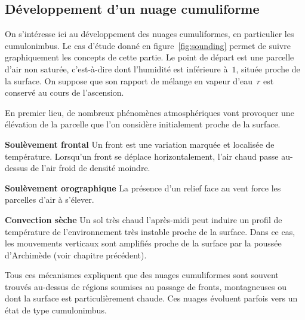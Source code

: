 
\sk
\subsection{Développement d'un nuage cumuliforme}

\sk
On s'intéresse ici au développement des nuages cumuliformes, en particulier les cumulonimbus. Le cas d'étude donné en figure~\ref{fig:sounding} permet de suivre graphiquement les concepts de cette partie. Le point de départ est une parcelle d'air non saturée, c'est-à-dire dont l'humidité est inférieure à~$1$, située proche de la surface. On suppose que son rapport de mélange en vapeur d'eau~$r$ est conservé au cours de l'ascension. 

\sk
En premier lieu, de nombreux phénomènes atmosphériques vont provoquer une élévation de la parcelle que l'on considère initialement proche de la surface.
\begin{citemize}
\item{\textbf{Soulèvement frontal}} Un front est une variation marquée et localisée de température. Lorsqu'un front se déplace horizontalement, l'air chaud passe au-dessus de l'air froid de densité moindre. 
\item{\textbf{Soulèvement orographique}} La présence d'un relief face au vent force les parcelles d'air à s'élever.
\item{\textbf{Convection sèche}} Un sol très chaud l'après-midi peut induire un profil de température de l'environnement très instable proche de la surface. Dans ce cas, les mouvements verticaux sont amplifiés proche de la surface par la poussée d'Archimède (voir chapitre précédent).
\end{citemize}
Tous ces mécanismes expliquent que des nuages cumuliformes sont souvent trouvés au-dessus de régions soumises au passage de fronts, montagneuses ou dont la surface est particulièrement chaude. Ces nuages évoluent parfois vers un état de type cumulonimbus.

